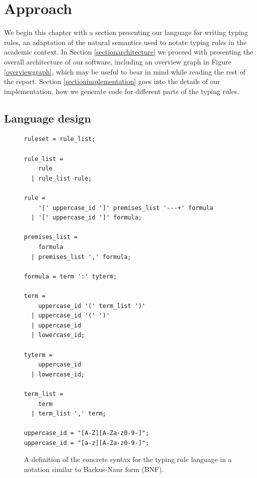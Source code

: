 \documentclass[nofilelist]{cslthse-msc}
\newcommand{\CR}[1]{\textcolor{green!60!black}{[\textbf{CR}:#1]}}
\begin{document}
\chapter{Approach} %

We begin this chapter with a section presenting our language for writing typing rules, an adaptation of the natural semantics used to notate typing rules in the academic context.
In Section \ref{sectionarchitecture} we proceed with presenting the overall architecture of our software, including an overview graph in Figure \ref{overviewgraph}, which may be useful to bear in mind while reading the rest of the report.
Section \ref{sectionimplementation} goes into the details of our implementation, how we generate code for different parts of the typing rules.

\section{Language design}\label{sectionlanguage}
\begin{figure}[]
\begin{lstlisting}[]
ruleset = rule_list;

rule_list =
    rule
  | rule_list rule;

rule =
    '[' uppercase_id ']' premises_list '---+' formula
  | '[' uppercase_id ']' formula;

premises_list =
    formula
  | premises_list ',' formula;

formula = term ':' tyterm;

term =
    uppercase_id '(' term_list ')'
  | uppercase_id '(' ')'
  | uppercase_id
  | lowercase_id;

tyterm =
    uppercase_id
  | lowercase_id;

term_list =
    term
  | term_list ',' term;

uppercase_id = "[A-Z][A-Za-z0-9-]";
uppercase_id = "[a-z][A-Za-z0-9-]";
\end{lstlisting}
  \caption{A definition of the concrete syntax for the typing rule language in a notation similar to Backus-Naur form (BNF).}
  \label{trconcretesyntaxspec}
\end{figure}
\end{document}

